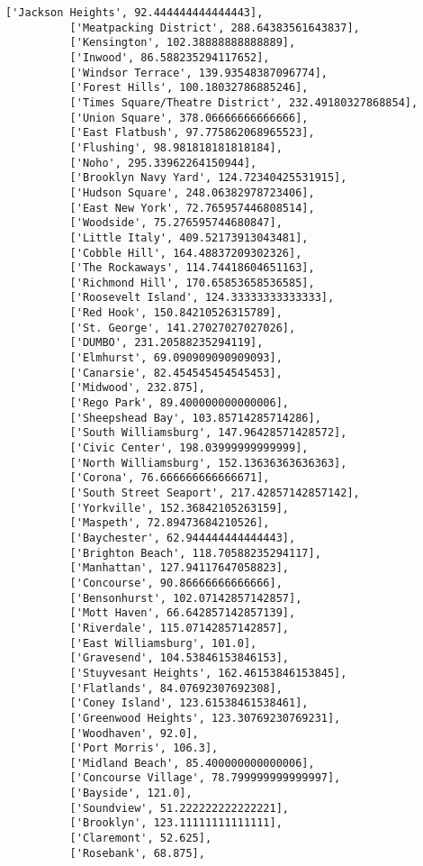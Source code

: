 \documentclass[11pt]{article}
\begin{document}
\begin{Verbatim}[commandchars=\\\{\}]
          ['Jackson Heights', 92.444444444444443],
          ['Meatpacking District', 288.64383561643837],
          ['Kensington', 102.38888888888889],
          ['Inwood', 86.588235294117652],
          ['Windsor Terrace', 139.93548387096774],
          ['Forest Hills', 100.18032786885246],
          ['Times Square/Theatre District', 232.49180327868854],
          ['Union Square', 378.06666666666666],
          ['East Flatbush', 97.775862068965523],
          ['Flushing', 98.981818181818184],
          ['Noho', 295.33962264150944],
          ['Brooklyn Navy Yard', 124.72340425531915],
          ['Hudson Square', 248.06382978723406],
          ['East New York', 72.765957446808514],
          ['Woodside', 75.276595744680847],
          ['Little Italy', 409.52173913043481],
          ['Cobble Hill', 164.48837209302326],
          ['The Rockaways', 114.74418604651163],
          ['Richmond Hill', 170.65853658536585],
          ['Roosevelt Island', 124.33333333333333],
          ['Red Hook', 150.84210526315789],
          ['St. George', 141.27027027027026],
          ['DUMBO', 231.20588235294119],
          ['Elmhurst', 69.090909090909093],
          ['Canarsie', 82.454545454545453],
          ['Midwood', 232.875],
          ['Rego Park', 89.400000000000006],
          ['Sheepshead Bay', 103.85714285714286],
          ['South Williamsburg', 147.96428571428572],
          ['Civic Center', 198.03999999999999],
          ['North Williamsburg', 152.13636363636363],
          ['Corona', 76.666666666666671],
          ['South Street Seaport', 217.42857142857142],
          ['Yorkville', 152.36842105263159],
          ['Maspeth', 72.89473684210526],
          ['Baychester', 62.944444444444443],
          ['Brighton Beach', 118.70588235294117],
          ['Manhattan', 127.94117647058823],
          ['Concourse', 90.86666666666666],
          ['Bensonhurst', 102.07142857142857],
          ['Mott Haven', 66.642857142857139],
          ['Riverdale', 115.07142857142857],
          ['East Williamsburg', 101.0],
          ['Gravesend', 104.53846153846153],
          ['Stuyvesant Heights', 162.46153846153845],
          ['Flatlands', 84.07692307692308],
          ['Coney Island', 123.61538461538461],
          ['Greenwood Heights', 123.30769230769231],
          ['Woodhaven', 92.0],
          ['Port Morris', 106.3],
          ['Midland Beach', 85.400000000000006],
          ['Concourse Village', 78.799999999999997],
          ['Bayside', 121.0],
          ['Soundview', 51.222222222222221],
          ['Brooklyn', 123.11111111111111],
          ['Claremont', 52.625],
          ['Rosebank', 68.875],

\end{Verbatim}
\end{document}
